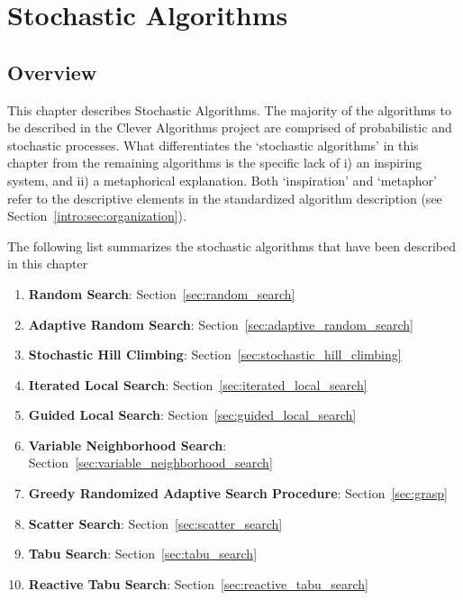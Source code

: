 

\chapter{Stochastic Algorithms}
\label{ch:stochastic}


% 
% 
\section{Overview}
This chapter describes Stochastic Algorithms.
The majority of the algorithms to be described in the Clever Algorithms project are comprised of probabilistic and stochastic processes. What differentiates the `stochastic algorithms' in this chapter from the remaining algorithms is the specific lack of i) an inspiring system, and ii) a metaphorical explanation. Both `inspiration' and `metaphor' refer to the descriptive elements in the standardized algorithm description (see Section~\ref{intro:sec:organization}).

The following list summarizes the stochastic algorithms that have been described in this chapter
\begin{enumerate}
	\item \textbf{Random Search}: Section~\ref{sec:random_search}
	\item \textbf{Adaptive Random Search}: Section~\ref{sec:adaptive_random_search}
	\item \textbf{Stochastic Hill Climbing}: Section~\ref{sec:stochastic_hill_climbing}
	\item \textbf{Iterated Local Search}: Section~\ref{sec:iterated_local_search}
	\item \textbf{Guided Local Search}: Section~\ref{sec:guided_local_search}
	\item \textbf{Variable Neighborhood Search}: Section~\ref{sec:variable_neighborhood_search}
	\item \textbf{Greedy Randomized Adaptive Search Procedure}: Section~\ref{sec:grasp}	
	\item \textbf{Scatter Search}: Section~\ref{sec:scatter_search}
	\item \textbf{Tabu Search}: Section~\ref{sec:tabu_search}
	\item \textbf{Reactive Tabu Search}: Section~\ref{sec:reactive_tabu_search}
\end{enumerate}

